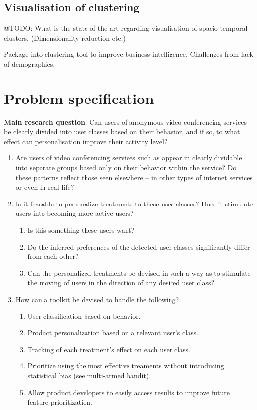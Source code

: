\subsection{Visualisation of clustering}

@TODO: What is the state of the art regarding visualisation of spacio-temporal clusters. (Dimensionality reduction etc.)

Package into clustering tool to improve business intelligence. Challenges from lack of demographics.

\section{Problem specification}
\label{sec:problem_specification}

\textbf{Main research question:} Can users of anonymous video conferencing services be clearly divided into user classes based on their behavior, and if so, to what effect can personalisation improve their activity level?

\begin{enumerate}
  \item Are users of video conferencing services such as appear.in clearly dividable into separate groups based only on their behavior within the service? Do these patterns reflect those seen elsewhere -- in other types of internet services or even in real life?
  \item Is it feasable to personalize treatments to these user classes? Does it stimulate users into becoming more active users?
  \begin{enumerate}
    \item Is this something these users want?
    \item Do the inferred preferences of the detected user classes significantly differ from each other?
    \item Can the personalized treatments be devised in such a way as to stimulate the moving of users in the direction of any desired user class?
  \end{enumerate}
  \item How can a toolkit be devised to handle the following?
  \begin{enumerate}
    \item User classification based on behavior.
    \item Product personalization based on a relevant user's class.
    \item Tracking of each treatment's effect on each user class.
    \item Prioritize using the most effective treaments without introducing statistical bias (see multi-armed bandit).
    \item Allow product developers to easily access results to improve future feature prioritization.
  \end{enumerate}
\end{enumerate}

